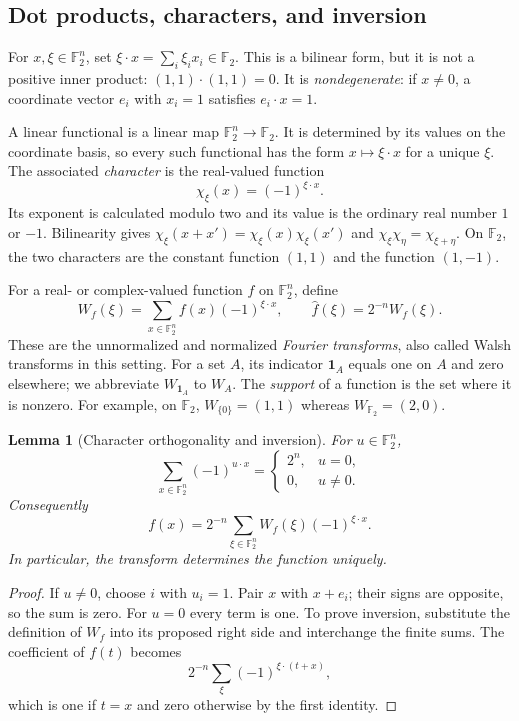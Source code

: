 \documentclass[11pt]{article}
\numberwithin{equation}{section}
\newtheorem{lemma}[theorem]{Lemma}
\theoremstyle{definition}
\theoremstyle{remark}\newtheorem{remark}[theorem]{Remark}
\newcommand{\F}{\mathbb F_2}
\newcommand{\one}{\mathbf1}
\begin{document}
\subsection{Dot products, characters, and inversion}
For $x,\xi\in\F^n$, set $\xi\cdot x=\sum_i\xi_ix_i\in\F$. This is a bilinear form, but it is not a positive inner product: $(1,1)\cdot(1,1)=0$. It is \emph{nondegenerate}: if $x\ne0$, a coordinate vector $e_i$ with $x_i=1$ satisfies $e_i\cdot x=1$.

A linear functional is a linear map $\F^n\to\F$. It is determined by its values on the coordinate basis, so every such functional has the form $x\mapsto\xi\cdot x$ for a unique $\xi$. The associated \emph{character} is the real-valued function
\[
 \chi_\xi(x)=(-1)^{\xi\cdot x}.
\]
Its exponent is calculated modulo two and its value is the ordinary real number $1$ or $-1$. Bilinearity gives $\chi_\xi(x+x')=\chi_\xi(x)\chi_\xi(x')$ and $\chi_\xi\chi_\eta=\chi_{\xi+\eta}$. On $\F$, the two characters are the constant function $(1,1)$ and the function $(1,-1)$.

For a real- or complex-valued function $f$ on $\F^n$, define
\[
 W_f(\xi)=\sum_{x\in\F^n}f(x)(-1)^{\xi\cdot x},
 \qquad \widehat f(\xi)=2^{-n}W_f(\xi).
\]
These are the unnormalized and normalized \emph{Fourier transforms}, also called Walsh transforms in this setting. For a set $A$, its indicator $\one_A$ equals one on $A$ and zero elsewhere; we abbreviate $W_{\one_A}$ to $W_A$. The \emph{support} of a function is the set where it is nonzero. For example, on $\F$, $W_{\{0\}}=(1,1)$ whereas $W_{\F}=(2,0)$.

\begin{lemma}[Character orthogonality and inversion]\label{lem:inversion}
For $u\in\F^n$,
\[
 \sum_{x\in\F^n}(-1)^{u\cdot x}
 =\begin{cases}2^n,&u=0,\\0,&u\ne0.\end{cases}
\]
Consequently
\begin{equation}\label{eq:inversion}
 f(x)=2^{-n}\sum_{\xi\in\F^n}W_f(\xi)(-1)^{\xi\cdot x}.
\end{equation}
In particular, the transform determines the function uniquely.
\end{lemma}
\begin{proof}
If $u\ne0$, choose $i$ with $u_i=1$. Pair $x$ with $x+e_i$; their signs are opposite, so the sum is zero. For $u=0$ every term is one. To prove inversion, substitute the definition of $W_f$ into its proposed right side and interchange the finite sums. The coefficient of $f(t)$ becomes
\[
 2^{-n}\sum_\xi(-1)^{\xi\cdot(t+x)},
\]
which is one if $t=x$ and zero otherwise by the first identity.
\end{proof}
\end{document}
